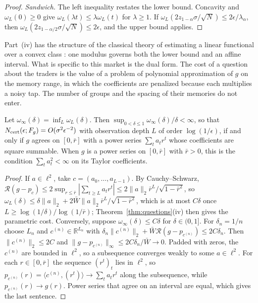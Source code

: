 \begin{proof}
\emph{Sandwich.} The left inequality restates the lower bound. Concavity and $\omega_L(0)\ge0$ give $\omega_L(\lambda t)\le\lambda\omega_L(t)$ for $\lambda\ge1$. If $\omega_L(2z_{1-\alpha}\sigma/\sqrt N)\le2\epsilon/\lambda_\alpha$, then $\omega_L(2z_{1-\alpha/2}\sigma/\sqrt N)\le2\epsilon$, and the upper bound applies.
\end{proof}

Part~(iv) has the structure of the classical theory of estimating a linear functional over a convex class \citep{donoho1994}: one modulus governs both the lower bound and an affine interval. What is specific to this market is the dual form. The cost of a question about the traders is the value of a problem of polynomial approximation of $g$ on the memory range, in which the coefficients are penalized because each multiplies a noisy tap. The number of groups and the spacing of their memories do not enter.

\begin{proposition}\label{prop:parametric}
Let $\omega_\infty(\delta)=\inf_L\omega_L(\delta)$. Then $\sup_{0<\delta\le1}\omega_\infty(\delta)/\delta<\infty$, so that $N_{\rm cert}(\epsilon;F_g)=O(\sigma^2\epsilon^{-2})$ with observation depth $L$ of order $\log(1/\epsilon)$, if and only if $g$ agrees on $[0,\bar r]$ with a power series $\sum_ta_tr^t$ whose coefficients are square summable. When $g$ is a power series on $[0,\bar r]$ with $\bar r>0$, this is the condition $\sum_ta_t^2<\infty$ on its Taylor coefficients.
\end{proposition}

\begin{proof}
If $a\in\ell^2$, take $c=(a_0,\ldots,a_{L-1})$. By Cauchy--Schwarz, $\mathcal R(g-p_c)\le2\sup_{r\le\bar r}|\sum_{t\ge L}a_tr^t|\le2\|a\|_2\bar r^L/\sqrt{1-\bar r^2}$, so $\omega_L(\delta)\le\delta\|a\|_2+2\bar W\|a\|_2\bar r^L/\sqrt{1-\bar r^2}$, which is at most $C\delta$ once $L\ge\log(1/\delta)/\log(1/\bar r)$; Theorem~\ref{thm:questions}(iv) then gives the parametric cost. Conversely, suppose $\omega_\infty(\delta)\le C\delta$ for $\delta\in(0,1]$. For $\delta_n=1/n$ choose $L_n$ and $c^{(n)}\in\mathbb R^{L_n}$ with $\delta_n\|c^{(n)}\|_2+\bar W\mathcal R(g-p_{c^{(n)}})\le2C\delta_n$. Then $\|c^{(n)}\|_2\le2C$ and $\|g-p_{c^{(n)}}\|_\infty\le2C\delta_n/\bar W\to0$. Padded with zeros, the $c^{(n)}$ are bounded in $\ell^2$, so a subsequence converges weakly to some $a\in\ell^2$. For each $r\in[0,\bar r]$ the sequence $(r^t)_t$ lies in $\ell^2$, so $p_{c^{(n)}}(r)=\langle c^{(n)},(r^t)\rangle\to\sum_ta_tr^t$ along the subsequence, while $p_{c^{(n)}}(r)\to g(r)$. Power series that agree on an interval are equal, which gives the last sentence.
\end{proof}

